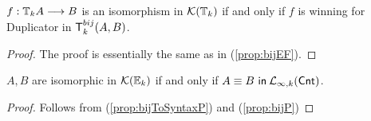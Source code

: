 \begin{prop}
$f:{\mathbb{T}_{k}A} \longrightarrow B$ is an isomorphism in $\mathcal{K}({\mathbb{T}_{k}})$ if and only if $f$ is winning for Duplicator in ${\mathsf{T}^{bij}_{k}(A,B)}$.
\begin{proof}
The proof is essentially the same as in (\ref{prop:bijEF}). 
\end{proof}
\begin{cor}
$A,B$ are isomorphic in $\mathcal{K}({\mathbb{E}_{k}})$ if and only if ${A \equiv B \ \mathsf{in}\: \mathcal{L}_{\infty,k}(\mathsf{Cnt})}$.
\begin{proof}
Follows from (\ref{prop:bijToSyntaxP}) and (\ref{prop:bijP})
\end{proof}
\end{cor}
\label{prop:bijP}
\end{prop}
